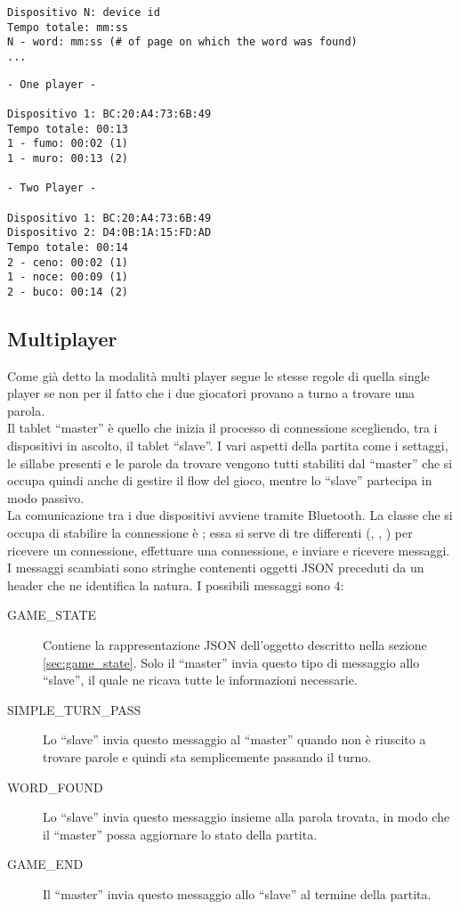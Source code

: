 \begin{lstlisting}[float, caption=Struttura delle satistiche inviate, label=lst:stats]
Dispositivo N: device id
Tempo totale: mm:ss
N - word: mm:ss (# of page on which the word was found)
...
\end{lstlisting}


\begin{lstlisting}[float, caption=Esempio di statistiche, label=lst:stats_example]
- One player -

Dispositivo 1: BC:20:A4:73:6B:49
Tempo totale: 00:13
1 - fumo: 00:02 (1)
1 - muro: 00:13 (2)

- Two Player -

Dispositivo 1: BC:20:A4:73:6B:49
Dispositivo 2: D4:0B:1A:15:FD:AD
Tempo totale: 00:14
2 - ceno: 00:02 (1)
1 - noce: 00:09 (1)
2 - buco: 00:14 (2)
\end{lstlisting}

\subsection{Multiplayer}
\label{sec:multiplayer}
Come già detto la modalità multi player segue le stesse regole di quella single player se non per il fatto che i due giocatori provano a turno a trovare una parola.\\
Il tablet ``master'' è quello che inizia il processo di connessione scegliendo, tra i dispositivi in ascolto, il tablet ``slave''. I vari aspetti della partita come i settaggi, le sillabe presenti e le parole da trovare vengono tutti stabiliti dal ``master'' che si occupa quindi anche di gestire il flow del gioco, mentre lo ``slave'' partecipa in modo passivo.\\
La comunicazione tra i due dispositivi avviene tramite Bluetooth. La classe che si occupa di stabilire la connessione è ; essa si serve di tre  differenti (, , ) per ricevere un connessione, effettuare una connessione, e inviare e ricevere messaggi.\\
I messaggi scambiati sono stringhe contenenti oggetti JSON preceduti da un header che ne identifica la natura. I possibili messaggi sono $4$:

\begin{description}
    \item[GAME\_STATE] Contiene la rappresentazione JSON dell'oggetto  descritto nella sezione \ref{sec:game_state}. Solo il ``master'' invia questo tipo di messaggio allo ``slave'', il quale ne ricava tutte le informazioni necessarie.
    \item[SIMPLE\_TURN\_PASS] Lo ``slave'' invia questo messaggio al ``master'' quando non è riuscito a trovare parole e quindi sta semplicemente passando il turno.
    \item[WORD\_FOUND] Lo ``slave'' invia questo messaggio insieme alla parola trovata, in modo che il ``master'' possa aggiornare lo stato della partita.
    \item[GAME\_END] Il ``master'' invia questo messaggio allo ``slave'' al termine della partita.
\end{description}
